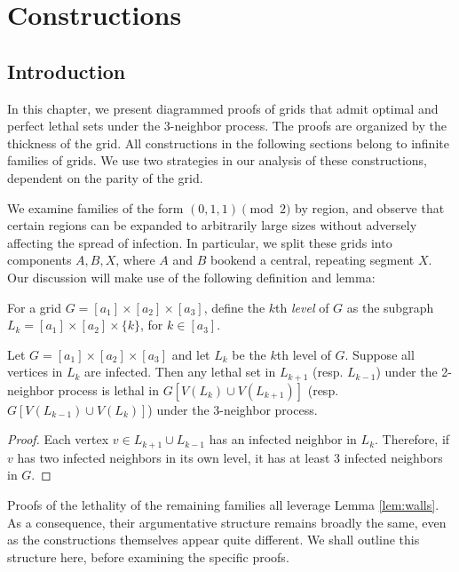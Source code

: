 \chapter{Constructions}

\section{Introduction}

In this chapter, we present diagrammed proofs of grids that admit optimal and perfect lethal sets under the 3-neighbor process. The proofs are organized by the thickness of the grid. All constructions in the following sections belong to infinite families of grids. We use two strategies in our analysis of these constructions, dependent on the parity of the grid. 

We examine families of the form $(0,1,1) \pmod 2$ by region, and observe that certain regions can be expanded to arbitrarily large sizes without adversely affecting the spread of infection. In particular, we split these grids into components $A,B,X$, where $A$ and $B$ bookend a central, repeating segment $X$. Our discussion will make use of the following definition and lemma:

\begin{defn}
For a grid $G=[a_1] \times [a_2] \times [a_3]$, define the $k$th \emph{level} of $G$ as the subgraph $L_k = [a_1] \times [a_2] \times \{k\}$, for $k \in [a_3]$. 
\end{defn}

\begin{lem}
\label{lem:2_neighbor_levels}
Let $G=[a_1] \times [a_2] \times [a_3]$ and let $L_k$ be the $k$th level of $G$. Suppose all vertices in $L_k$ are infected. Then any lethal set in $L_{k+1}$ (resp. $L_{k-1}$) under the 2-neighbor process is lethal in $G[V(L_{k}) \cup V(L_{k+1})]$ (resp. $G[V(L_{k-1}) \cup V(L_{k})]$) under the 3-neighbor process. 
\end{lem}

\begin{proof}
Each vertex $v \in L_{k+1} \cup L_{k-1}$ has an infected neighbor in $L_k$. Therefore, if $v$ has two infected neighbors in its own level, it has at least 3 infected neighbors in $G$. 
\end{proof}

Proofs of the lethality of the remaining families all leverage Lemma \ref{lem:walls}. As a consequence, their argumentative structure remains broadly the same, even as the constructions themselves appear quite different. We shall outline this structure here, before examining the specific proofs. 


